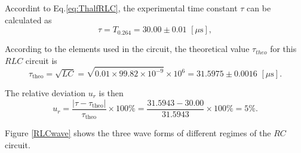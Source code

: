 \documentclass{article}
\begin{document}
Accordint to Eq.\eqref{eq:ThalfRLC}, the experimental time constant $\tau$ can be calculated as
$$\tau = T_{0.264} = 30.00 \pm 0.01\,\,[\mu\text{s}],$$

According to the elements used in the circuit, the theoretical value $\tau_{theo}$ for this $RLC$ circuit is
$$\tau_{\text{theo}} = \sqrt{LC} = \sqrt{0.01 \times 99.82 \times 10^{-9}} \times 10^{6} = 31.5975 \pm 0.0016 \,\,[\mu\text{s}].$$

The relative deviation $u_r$ is then
$$u_r = \frac{|\tau-\tau_{\text{theo}}|}{\tau_{\text{theo}}} \times 100\% = \frac{31.5943 - 30.00}{31.5943} \times 100\% = 5\%.$$


Figure \ref{RLCwave} shows the three wave forms of different regimes of the $RC$ circuit.

\begin{figure}[H]
\centering
{}%

%


\end{figure}
\end{document}
